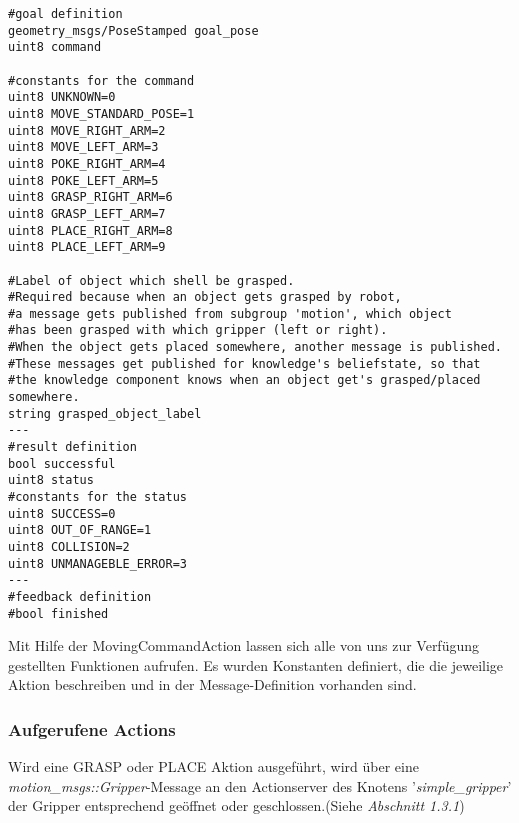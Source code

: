 \documentclass{suturo}
\begin{document}
\noindent
\begin{minipage}{\linewidth}
\begin{lstlisting}[caption={Definition des MovingCommands},captionpos=b]
#goal definition
geometry_msgs/PoseStamped goal_pose
uint8 command

#constants for the command
uint8 UNKNOWN=0
uint8 MOVE_STANDARD_POSE=1
uint8 MOVE_RIGHT_ARM=2
uint8 MOVE_LEFT_ARM=3
uint8 POKE_RIGHT_ARM=4
uint8 POKE_LEFT_ARM=5
uint8 GRASP_RIGHT_ARM=6
uint8 GRASP_LEFT_ARM=7
uint8 PLACE_RIGHT_ARM=8
uint8 PLACE_LEFT_ARM=9

#Label of object which shell be grasped.
#Required because when an object gets grasped by robot,
#a message gets published from subgroup 'motion', which object
#has been grasped with which gripper (left or right).
#When the object gets placed somewhere, another message is published.
#These messages get published for knowledge's beliefstate, so that
#the knowledge component knows when an object get's grasped/placed somewhere.
string grasped_object_label
---
#result definition
bool successful
uint8 status
#constants for the status
uint8 SUCCESS=0
uint8 OUT_OF_RANGE=1
uint8 COLLISION=2
uint8 UNMANAGEBLE_ERROR=3
---
#feedback definition
#bool finished
\end{lstlisting}
\end{minipage}

Mit Hilfe der MovingCommandAction lassen sich alle von uns zur Verfügung gestellten Funktionen aufrufen. Es wurden Konstanten definiert, die die jeweilige Aktion beschreiben und in der Message-Definition vorhanden sind.

\subsubsection{Aufgerufene Actions}
Wird eine GRASP oder PLACE Aktion ausgeführt, wird über eine \\
\textit{motion\_msgs::Gripper}-Message an den Actionserver des Knotens '\textit{simple\_gripper}' der Gripper entsprechend geöffnet oder geschlossen.(Siehe \textit{Abschnitt 1.3.1})\\
\end{document}
